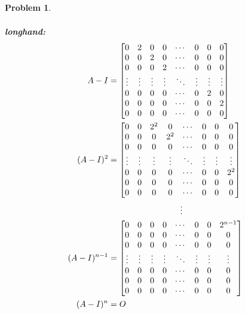 \documentclass{article}
\newcommand{\subno}[1]{\par\noindent\textbf{#1}}
\theoremstyle{pprop}
\newtheorem{problem}{Problem}[section]
\begin{document}
\begin{problem}
\begin{align*}
\end{align*}
\subno{longhand:}
\begin{align*}
A-I &=
\begin{bmatrix}
0 & 2 & 0 & 0 & \cdots &0 & 0 & 0 \\
0 & 0 & 2 & 0 & \cdots & 0& 0 & 0 \\
0 & 0 & 0 & 2 & \cdots & 0& 0 & 0 \\
\vdots & \vdots & \vdots & \vdots & \ddots &\vdots & \vdots & \vdots \\
0 & 0 & 0 & 0 & \cdots & 0 & 2 & 0 \\
0 & 0 & 0 & 0 & \cdots & 0 & 0 & 2 \\
0 & 0 & 0 & 0 & \cdots & 0 & 0 & 0 \\
\end{bmatrix} \\ 
(A-I)^2&=
\begin{bmatrix}
0 & 0 & 2^2 & 0 & \cdots &0 & 0 & 0 \\
0 & 0 & 0 & 2^2 & \cdots & 0& 0 & 0 \\
0 & 0 & 0 & 0 & \cdots & 0& 0 & 0 \\
\vdots & \vdots & \vdots & \vdots & \ddots &\vdots & \vdots & \vdots \\
0 & 0 & 0 & 0 & \cdots & 0 & 0 & 2^2 \\
0 & 0 & 0 & 0 & \cdots & 0 & 0 & 0 \\
0 & 0 & 0 & 0 & \cdots & 0 & 0 & 0 \\
\end{bmatrix} \\ 
&\kern20ex\vdots \\
(A-I)^{n-1}&=
\begin{bmatrix}
0 & 0 & 0 & 0 & \cdots &0 & 0 & 2^{n-1} \\
0 & 0 & 0 & 0 & \cdots & 0& 0 & 0 \\
0 & 0 & 0 & 0 & \cdots & 0& 0 & 0 \\
\vdots & \vdots & \vdots & \vdots & \ddots &\vdots & \vdots & \vdots \\
0 & 0 & 0 & 0 & \cdots & 0 & 0 & 0 \\
0 & 0 & 0 & 0 & \cdots & 0 & 0 & 0 \\
0 & 0 & 0 & 0 & \cdots & 0 & 0 & 0 \\
\end{bmatrix}\\
(A-I)^n & = O  
\end{align*}
\end{problem}
\end{document}
